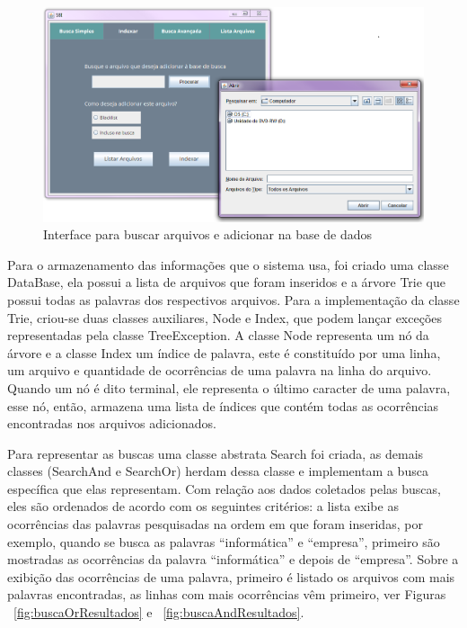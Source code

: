 \documentclass[12pt]{article}
\begin{document}
\begin{figure}[!htb]
\centering
\includegraphics[width=.9\textwidth]{img/telaProcurarArquivo.png}
\caption{Interface para buscar arquivos e adicionar na base de dados}
\label{fig:procurarArquivos}
\end{figure}

	Para o armazenamento das informações que o sistema usa, foi criado uma classe DataBase, ela possui a lista de arquivos que foram inseridos e a árvore Trie que possui  todas as palavras dos respectivos arquivos. Para a implementação da classe Trie, criou-se duas classes auxiliares, Node e Index, que podem lançar exceções representadas pela classe TreeException. A classe Node representa um nó da árvore e a classe Index um índice de palavra, este é constituído por uma linha, um arquivo e quantidade de ocorrências de uma palavra na linha do arquivo. Quando um nó é dito terminal, ele representa o último caracter de uma palavra, esse nó, então, armazena uma lista de índices que contém todas as ocorrências encontradas nos arquivos adicionados.
	
	Para representar as buscas uma classe abstrata Search foi criada, as demais classes (SearchAnd e SearchOr) herdam dessa classe e implementam a busca específica que elas representam. Com relação aos dados coletados pelas buscas, eles são ordenados de acordo com os seguintes critérios: a lista exibe as ocorrências das palavras pesquisadas na ordem em que foram inseridas, por exemplo, quando se busca as palavras “informática” e “empresa”, primeiro são mostradas as ocorrências da palavra “informática” e depois de “empresa”. Sobre a exibição das ocorrências de uma palavra, primeiro é listado os arquivos com mais palavras encontradas, as linhas com mais ocorrências vêm primeiro, ver Figuras ~\ref{fig:buscaOrResultados} e ~\ref{fig:buscaAndResultados}. 
\end{document}
